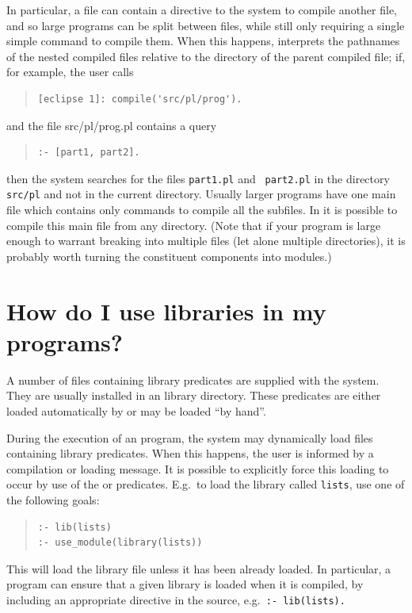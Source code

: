 In particular, a file can contain a directive to the system to compile
another file, and so large programs can be split between files, while
still only requiring a single simple command to compile them.
 When this happens,
{\eclipse} interprets the pathnames of the nested compiled files
relative to the directory of the parent compiled file; if, for
example, the user calls
\begin{quote}
\begin{verbatim}
[eclipse 1]: compile('src/pl/prog').
\end{verbatim}
\end{quote}
and the file src/pl/prog.pl contains a query
\begin{quote}
\begin{verbatim}
:- [part1, part2].
\end{verbatim}
\end{quote}
then the system searches for the files {\tt part1.pl} and {\tt
part2.pl} in the directory {\tt src/pl} and not in the current
directory.  Usually larger {\eclipse} programs have one main file
which contains only commands to compile all the subfiles.  In
{\eclipse} it is possible to compile this main file from any
directory.  (Note that if your program is large enough to warrant
breaking into multiple files (let alone multiple directories), it is
probably worth turning the constituent components into modules.)

\section{How do I use {\eclipse} libraries in my programs?}

A number of files containing library predicates are supplied with the
{\eclipse} system.  They are usually installed in an {\eclipse}
library directory.  These predicates are either loaded automatically
by {\eclipse} or may be loaded ``by hand''.

During the execution of an {\eclipse} program, the system may
dynamically load files containing library predicates. When this
happens, the user is informed by a compilation or loading message.  It
is possible to explicitly force this loading to occur by use of the
 or
predicates.  E.g.\ to load the library called {\tt lists}, use one of
the following goals:
\begin{quote}
\begin{verbatim}
:- lib(lists)
:- use_module(library(lists))
\end{verbatim} 
\end{quote}
This will load the library file unless it has been already loaded.  In
particular, a program can ensure that a given library is loaded when
it is compiled, by including an appropriate directive in the source,
e.g.\ {\tt :- lib(lists).}


